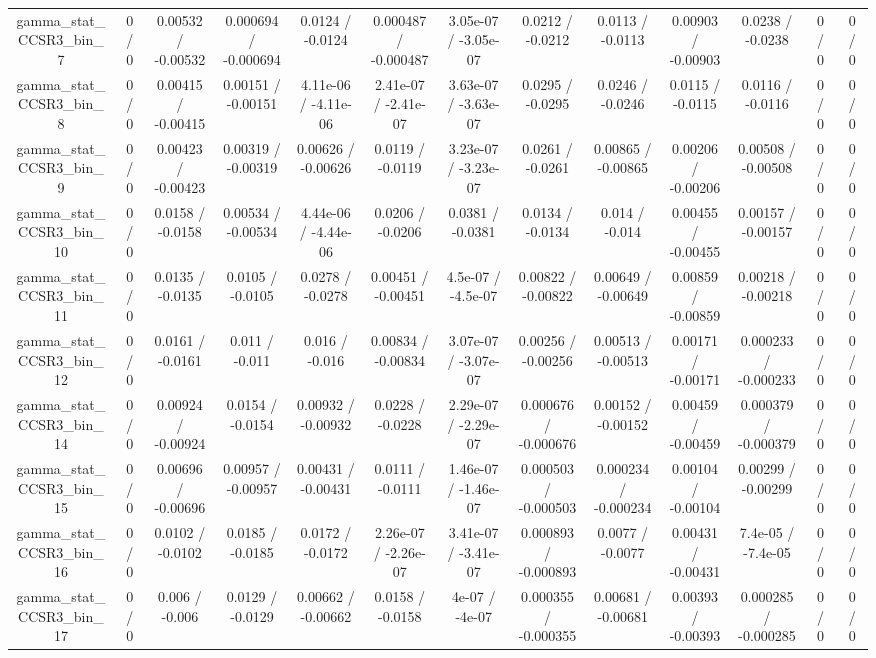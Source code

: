\documentclass[10pt]{article}
\begin{document}
\begin{table}[htbp]
\begin{center}
\begin{tabular}{|c|c|c|c|c|c|c|c|c|c|c|c|c|}
  gamma_stat_CCSR3_bin_7 & 0 / 0 & 0.00532 / -0.00532 & 0.000694 / -0.000694 & 0.0124 / -0.0124 & 0.000487 / -0.000487 & 3.05e-07 / -3.05e-07 & 0.0212 / -0.0212 & 0.0113 / -0.0113 & 0.00903 / -0.00903 & 0.0238 / -0.0238 & 0 / 0 & 0 / 0 \\ 
  gamma_stat_CCSR3_bin_8 & 0 / 0 & 0.00415 / -0.00415 & 0.00151 / -0.00151 & 4.11e-06 / -4.11e-06 & 2.41e-07 / -2.41e-07 & 3.63e-07 / -3.63e-07 & 0.0295 / -0.0295 & 0.0246 / -0.0246 & 0.0115 / -0.0115 & 0.0116 / -0.0116 & 0 / 0 & 0 / 0 \\ 
  gamma_stat_CCSR3_bin_9 & 0 / 0 & 0.00423 / -0.00423 & 0.00319 / -0.00319 & 0.00626 / -0.00626 & 0.0119 / -0.0119 & 3.23e-07 / -3.23e-07 & 0.0261 / -0.0261 & 0.00865 / -0.00865 & 0.00206 / -0.00206 & 0.00508 / -0.00508 & 0 / 0 & 0 / 0 \\ 
  gamma_stat_CCSR3_bin_10 & 0 / 0 & 0.0158 / -0.0158 & 0.00534 / -0.00534 & 4.44e-06 / -4.44e-06 & 0.0206 / -0.0206 & 0.0381 / -0.0381 & 0.0134 / -0.0134 & 0.014 / -0.014 & 0.00455 / -0.00455 & 0.00157 / -0.00157 & 0 / 0 & 0 / 0 \\ 
  gamma_stat_CCSR3_bin_11 & 0 / 0 & 0.0135 / -0.0135 & 0.0105 / -0.0105 & 0.0278 / -0.0278 & 0.00451 / -0.00451 & 4.5e-07 / -4.5e-07 & 0.00822 / -0.00822 & 0.00649 / -0.00649 & 0.00859 / -0.00859 & 0.00218 / -0.00218 & 0 / 0 & 0 / 0 \\ 
  gamma_stat_CCSR3_bin_12 & 0 / 0 & 0.0161 / -0.0161 & 0.011 / -0.011 & 0.016 / -0.016 & 0.00834 / -0.00834 & 3.07e-07 / -3.07e-07 & 0.00256 / -0.00256 & 0.00513 / -0.00513 & 0.00171 / -0.00171 & 0.000233 / -0.000233 & 0 / 0 & 0 / 0 \\ 
  gamma_stat_CCSR3_bin_14 & 0 / 0 & 0.00924 / -0.00924 & 0.0154 / -0.0154 & 0.00932 / -0.00932 & 0.0228 / -0.0228 & 2.29e-07 / -2.29e-07 & 0.000676 / -0.000676 & 0.00152 / -0.00152 & 0.00459 / -0.00459 & 0.000379 / -0.000379 & 0 / 0 & 0 / 0 \\ 
  gamma_stat_CCSR3_bin_15 & 0 / 0 & 0.00696 / -0.00696 & 0.00957 / -0.00957 & 0.00431 / -0.00431 & 0.0111 / -0.0111 & 1.46e-07 / -1.46e-07 & 0.000503 / -0.000503 & 0.000234 / -0.000234 & 0.00104 / -0.00104 & 0.00299 / -0.00299 & 0 / 0 & 0 / 0 \\ 
  gamma_stat_CCSR3_bin_16 & 0 / 0 & 0.0102 / -0.0102 & 0.0185 / -0.0185 & 0.0172 / -0.0172 & 2.26e-07 / -2.26e-07 & 3.41e-07 / -3.41e-07 & 0.000893 / -0.000893 & 0.0077 / -0.0077 & 0.00431 / -0.00431 & 7.4e-05 / -7.4e-05 & 0 / 0 & 0 / 0 \\ 
  gamma_stat_CCSR3_bin_17 & 0 / 0 & 0.006 / -0.006 & 0.0129 / -0.0129 & 0.00662 / -0.00662 & 0.0158 / -0.0158 & 4e-07 / -4e-07 & 0.000355 / -0.000355 & 0.00681 / -0.00681 & 0.00393 / -0.00393 & 0.000285 / -0.000285 & 0 / 0 & 0 / 0 \\ 

\end{tabular}
\end{center}
\end{table}
\end{document}
